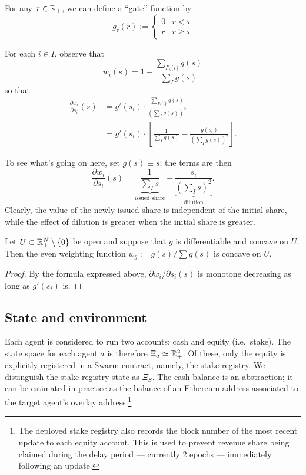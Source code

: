 \begin{example}
  For any $\tau\in\mathbb{R}_+$, we can define a ``gate'' function by
  \[
    g_\tau(r) := \left\{\begin{array}{ll} 0 & r<\tau \\ r & r\geq\tau\end{array}\right.
  \]
\end{example}

For each $i\in I$, observe that
\[
  w_i(s) = 1 - \frac{\sum_{I\setminus\{i\}}g(s)}{\sum_I g(s)}
\]
so that
\begin{align*}
  \frac{\partial w_i}{\partial s_i}(s) &= g'(s_i)\cdot \frac{\sum_{I\setminus\{i\}}g(s)}{(\sum_I g(s))^2} \\
  &=g'(s_i)\cdot\left[ \frac{1}{\sum_I g(s)} - \frac{g(s_i)}{(\sum_I g(s))^2} \right].
\end{align*}

To see what's going on here, set $g(s)\equiv s$; the terms are then
\[
  \frac{\partial w_i}{\partial s_i}(s)=
  \underbrace{\frac{1}{\sum_I s}}_{\text{issued share}} - \underbrace{\frac{s_i}{(\sum_I s)^2}}_{\text{dilution}} .
\]
Clearly, the value of the newly issued share is independent of the initial share, while the effect of dilution is greater when the initial share is greater.

\begin{lemma}

  Let $U\subset \mathbb{R}_+^N\setminus\{0\}$ be open and suppose that $g$ is differentiable and concave on $U$.
  Then the even weighting function $w_g := g(s)/\sum g(s)$ is concave on $U$.

\end{lemma}
%
\begin{proof}

  By the formula expressed above, $\partial w_i/\partial s_i(s)$ is monotone decreasing as long as $g'(s_i)$ is. \qedhere

\end{proof}

\subsection{State and environment}

Each agent is considered to run two accounts: cash and equity (i.e.~stake).
%
The state space for each agent $a$ is therefore $\Xi_a\simeq\mathbb{R}_+^2$.
%
Of these, only the equity is explicitly registered in a Swarm contract, namely, the stake registry.
%
We distinguish the stake registry state as $\Xi_S$.
%
The cash balance is an abstraction; it can be estimated in practice as the balance of an Ethereum address associated to the target agent's overlay address.\footnote{The deployed stake registry also records the block number of the most recent update to each equity account. This is used to prevent revenue share being claimed during the delay period --- currently 2 epochs --- immediately following an update.}

